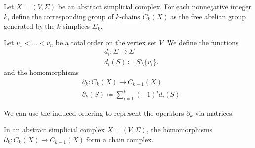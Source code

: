 \begin{definition}\label{def:group_of_chains}\cite[262]{Carlsson2009}
  Let $X = (V, \Sigma)$ be an abstract simplicial complex. For each nonnegative integer $k$, define the corresponding \ul{group of $k$-chains} $C_k(X)$ as the free abelian group generated by the $k$-simplices $\Sigma_k$.

  Let $v_1 < \ldots < v_n$ be a total order on the vertex set $V$. We define the functions
  \begin{align*}
    &d_i: \Sigma \to \Sigma \\
    &d_i(S) \coloneqq S \setminus \{ v_i \}.
  \end{align*}
  and the homomorphisms
  \begin{align*}
    &\partial_k: C_k(X) \to C_{k-1}(X) \\
    &\partial_k(S) \coloneqq \sum_{i=1}^k (-1)^i d_i(S)
  \end{align*}

  We can use the induced ordering to represent the operators $\partial_k$ via matrices.
\end{definition}

\begin{proposition}\label{def:abstract_simplicial_chain_complex}
  In an abstract simplicial complex $X = (V, \Sigma)$, the homomorphisms $\partial_k: C_k(X) \to C_{k-1}(X)$ form a chain complex.
\end{proposition}
